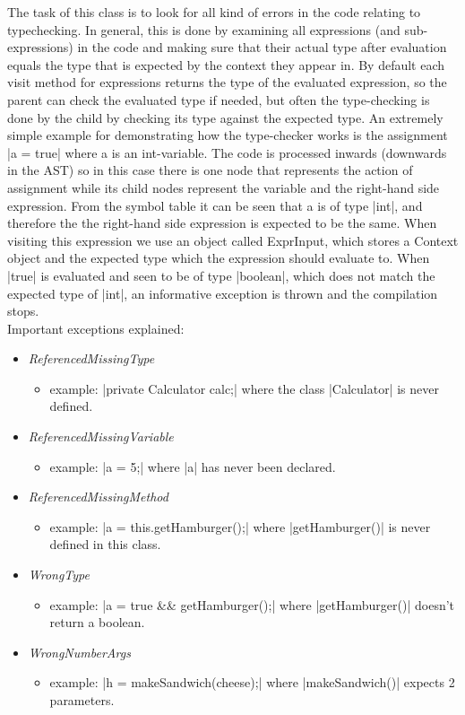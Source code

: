 \documentclass[paper=a4, fontsize=11pt]{scrartcl} %
\numberwithin{equation}{section} %
\numberwithin{figure}{section} %
\numberwithin{table}{section} %
\begin{document}
The task of this class is to look for all kind of errors in the code relating to typechecking.
In general, this is done by examining all expressions (and sub-expressions) in the code and making sure that their actual type after evaluation equals the type that is expected by the context they appear in.
By default each visit method for expressions returns the type of the evaluated expression, so the parent can check the evaluated type if needed, but often the type-checking is done by the child by checking its type against the expected type.
An extremely simple example for demonstrating how the type-checker works is the assignment |a = true| where a is an int-variable.
The code is processed inwards (downwards in the AST) so in this case there is one node that represents the action of assignment while its child nodes represent the variable and the right-hand side expression.
From the symbol table it can be seen that a is of type |int|, and therefore the the right-hand side expression is expected to be the same.
When visiting this expression we use an object called ExprInput, which stores a Context object and the expected type which the expression should evaluate to.
When |true| is evaluated and seen to be of type |boolean|, which does not match the expected type of |int|, an informative exception is thrown and the compilation stops.\\

Important exceptions explained:
\begin{itemize}
  \item{\emph{ReferencedMissingType}}
  \begin{itemize}
    \item{example: |private Calculator calc;| where the class |Calculator| is never defined.}
  \end{itemize}
  \item{\emph{ReferencedMissingVariable}}
  \begin{itemize}
    \item{example: |a = 5;| where |a| has never been declared.}
  \end{itemize}
  \item{\emph{ReferencedMissingMethod}}
  \begin{itemize}
    \item{example: |a = this.getHamburger();| where |getHamburger()| is never defined in this class.}
  \end{itemize}
  \item{\emph{WrongType}}
  \begin{itemize}
    \item{example: |a = true && getHamburger();| where |getHamburger()| doesn’t return a boolean.}
  \end{itemize}
  \item{\emph{WrongNumberArgs}}
  \begin{itemize}
    \item{example: |h = makeSandwich(cheese);| where |makeSandwich()| expects 2 parameters. }
  \end{itemize}
\end{itemize}
\end{document}
